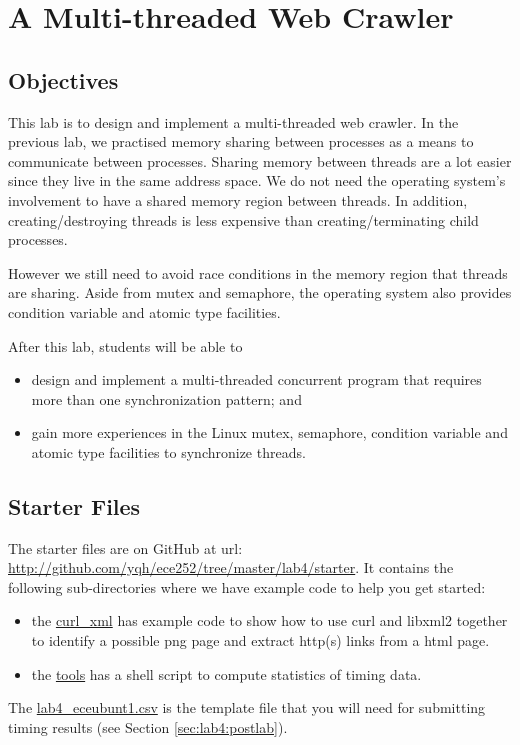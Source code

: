 \chapter{A Multi-threaded Web Crawler}

\section{Objectives}
This lab is to design and implement a multi-threaded web crawler. In the previous lab, we practised memory sharing between processes as a means to communicate between processes. Sharing memory between threads are a lot easier since they live in the same address space. We do not need the operating system's involvement to have a shared memory region between threads. In addition, creating/destroying threads is less expensive than creating/terminating child processes. 

However we still need to avoid race conditions in the memory region that threads are sharing. Aside from mutex and semaphore, the operating system also provides condition variable and atomic type facilities. 

After this lab, students will be able to
\begin{itemize}
\item design and implement a multi-threaded concurrent program that requires more than one synchronization pattern; and
\item gain more experiences in the Linux mutex, semaphore, condition variable and atomic type facilities to synchronize threads.
\end{itemize}

\section{Starter Files}
The starter files are on GitHub at url: \url{http://github.com/yqh/ece252/tree/master/lab4/starter}. It contains the following sub-directories where we have example code to help you get started:

\begin{itemize}
\item the \href{http://github.com/yqh/ece252/tree/master/lab4/starter/curl_xml}{curl\_xml} has example code to show how to use curl and libxml2 together to identify a possible png page and extract http(s) links from a html page.
\item the \href{http://github.com/yqh/ece252/tree/master/lab4/starter/tools}{tools} has a shell script to compute statistics of timing data.
\end{itemize}
The \href{http://github.com/yqh/ece252/tree/master/lab4/starter/lab4_eceubuntu1.csv}{lab4\_eceubunt1.csv} is the template file that you will need for submitting timing results (see Section \ref{sec:lab4:postlab}).

